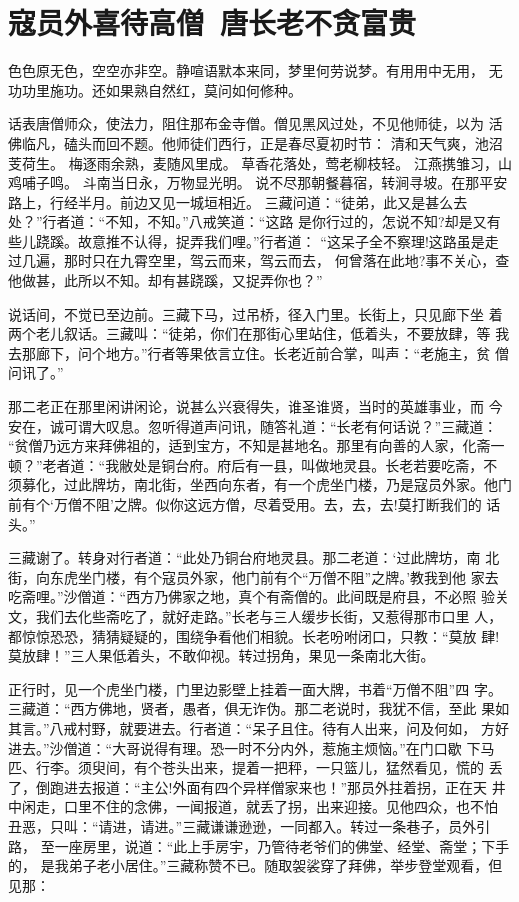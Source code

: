 \chapter{寇员外喜待高僧~唐长老不贪富贵}

色色原无色，空空亦非空。静喧语默本来同，梦里何劳说梦。有用用中无用，
无功功里施功。还如果熟自然红，莫问如何修种。

话表唐僧师众，使法力，阻住那布金寺僧。僧见黑风过处，不见他师徒，以为
活佛临凡，磕头而回不题。他师徒们西行，正是春尽夏初时节：
清和天气爽，池沼芰荷生。
梅逐雨余熟，麦随风里成。
草香花落处，莺老柳枝轻。
江燕携雏习，山鸡哺子鸣。
斗南当日永，万物显光明。
说不尽那朝餐暮宿，转涧寻坡。在那平安路上，行经半月。前边又见一城垣相近。
三藏问道：“徒弟，此又是甚么去处？”行者道：“不知，不知。”八戒笑道：“这路
是你行过的，怎说不知?却是又有些儿跷蹊。故意推不认得，捉弄我们哩。”行者道：
“这呆子全不察理!这路虽是走过几遍，那时只在九霄空里，驾云而来，驾云而去，
何曾落在此地?事不关心，查他做甚，此所以不知。却有甚跷蹊，又捉弄你也？”

说话间，不觉已至边前。三藏下马，过吊桥，径入门里。长街上，只见廊下坐
着两个老儿叙话。三藏叫：“徒弟，你们在那街心里站住，低着头，不要放肆，等
我去那廊下，问个地方。”行者等果依言立住。长老近前合掌，叫声：“老施主，贫
僧问讯了。”

那二老正在那里闲讲闲论，说甚么兴衰得失，谁圣谁贤，当时的英雄事业，而
今安在，诚可谓大叹息。忽听得道声问讯，随答礼道：“长老有何话说？”三藏道：
“贫僧乃远方来拜佛祖的，适到宝方，不知是甚地名。那里有向善的人家，化斋一
顿？”老者道：“我敝处是铜台府。府后有一县，叫做地灵县。长老若要吃斋，不
须募化，过此牌坊，南北街，坐西向东者，有一个虎坐门楼，乃是寇员外家。他门
前有个‘万僧不阻’之牌。似你这远方僧，尽着受用。去，去，去!莫打断我们的
话头。”

三藏谢了。转身对行者道：“此处乃铜台府地灵县。那二老道：‘过此牌坊，南
北街，向东虎坐门楼，有个寇员外家，他门前有个“万僧不阻”之牌。’教我到他
家去吃斋哩。”沙僧道：“西方乃佛家之地，真个有斋僧的。此间既是府县，不必照
验关文，我们去化些斋吃了，就好走路。”长老与三人缓步长街，又惹得那市口里
人，都惊惊恐恐，猜猜疑疑的，围绕争看他们相貌。长老吩咐闭口，只教：“莫放
肆!莫放肆！”三人果低着头，不敢仰视。转过拐角，果见一条南北大街。

正行时，见一个虎坐门楼，门里边影壁上挂着一面大牌，书着“万僧不阻”四
字。三藏道：“西方佛地，贤者，愚者，俱无诈伪。那二老说时，我犹不信，至此
果如其言。”八戒村野，就要进去。行者道：“呆子且住。待有人出来，问及何如，
方好进去。”沙僧道：“大哥说得有理。恐一时不分内外，惹施主烦恼。”在门口歇
下马匹、行李。须臾间，有个苍头出来，提着一把秤，一只篮儿，猛然看见，慌的
丢了，倒跑进去报道：“主公!外面有四个异样僧家来也！”那员外拄着拐，正在天
井中闲走，口里不住的念佛，一闻报道，就丢了拐，出来迎接。见他四众，也不怕
丑恶，只叫：“请进，请进。”三藏谦谦逊逊，一同都入。转过一条巷子，员外引路，
至一座房里，说道：“此上手房宇，乃管待老爷们的佛堂、经堂、斋堂；下手的，
是我弟子老小居住。”三藏称赞不已。随取袈裟穿了拜佛，举步登堂观看，但见那：

